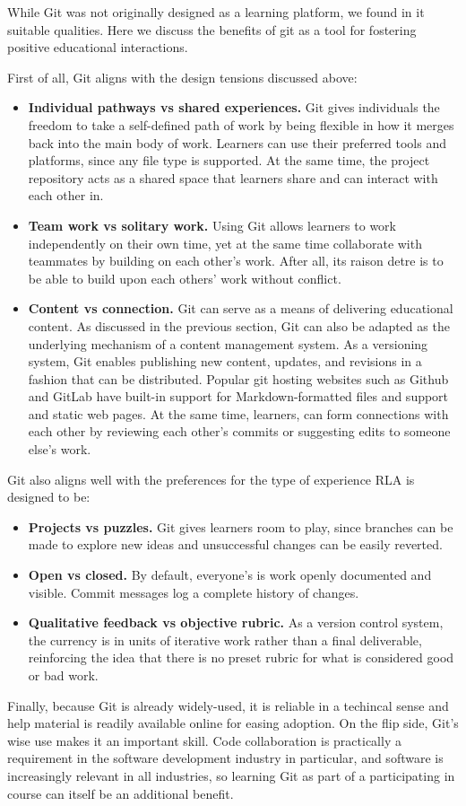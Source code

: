 \documentclass[12pt,twoside,vi]{mitthesis}
\newcommand{\draft}[1]{{\color{blue} #1}}
\begin{document}
\draft{While Git was not originally designed as a learning platform, we found in it suitable qualities. Here we discuss the benefits of git as a tool for fostering positive educational interactions.

First of all, Git aligns with the design tensions discussed above: 
\begin{itemize}
\item \textbf{Individual pathways vs shared experiences.} Git gives individuals the freedom to take a self-defined path of work by being flexible in how it merges back into the main body of work. Learners can use their preferred tools and platforms, since any file type is supported. At the same time, the project repository acts as a shared space that learners share and can interact with each other in.
\item \textbf{Team work vs solitary work.} Using Git allows learners to work independently on their own time, yet at the same time collaborate with teammates by building on each other's work. After all, its raison detre is to be able to build upon each others' work without conflict.
\item \textbf{Content vs connection.} Git can serve as a means of delivering educational content. As discussed in the previous section, Git can also be adapted as the underlying mechanism of a content management system. As a versioning system, Git enables publishing new content, updates, and revisions in a fashion that can be distributed. Popular git hosting websites such as Github and GitLab have built-in support for Markdown-formatted files and support and static web pages. At the same time, learners, can form connections with each other by reviewing each other's commits or suggesting edits to someone else's work. 
\end{itemize}

Git also aligns well with the preferences for the type of experience RLA is designed to be:
\begin{itemize}
\item \textbf{Projects vs puzzles.} Git gives learners room to play, since branches can be made to explore new ideas and unsuccessful changes can be easily reverted.  
\item \textbf{Open vs closed.} By default, everyone's is work openly documented and visible. Commit messages log a complete history of changes.
\item \textbf{Qualitative feedback vs objective rubric.} As a version control system, the currency is in units of iterative work rather than a final deliverable, reinforcing the idea that there is no preset rubric for what is considered good or bad work.
\end{itemize}

Finally, because Git is already widely-used, it is reliable in a techincal sense and help material is readily available online for easing adoption. On the flip side, Git's wise use makes it an important skill. Code collaboration is practically a requirement in the software development industry in particular, and software is increasingly relevant in all industries, so learning Git as part of a participating in course can itself be an additional benefit.~\cite{haaranen2015teaching}}
\end{document}
